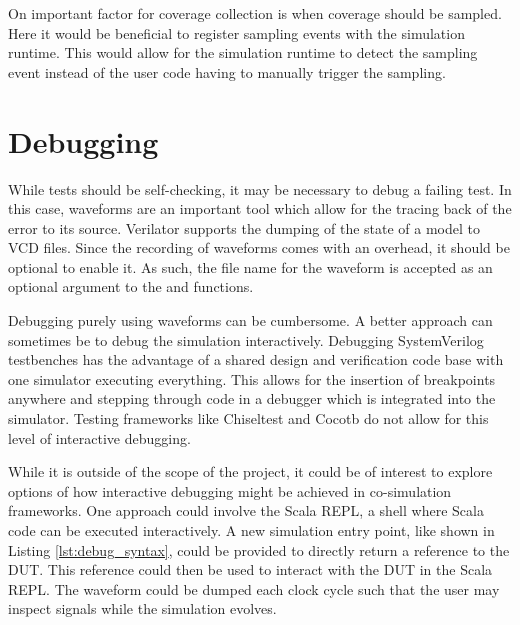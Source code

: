 On important factor for coverage collection is when coverage should be sampled. Here it would be beneficial to
register sampling events with the simulation runtime. This would allow for the simulation runtime to detect the
sampling event instead of the user code having to manually trigger the sampling.

\section{Debugging} %

While tests should be self-checking, it may be necessary to debug a failing test. In this case, waveforms are an
important tool which allow for the tracing back of the error to its source. Verilator supports the dumping of the
state of a model to VCD files. Since the recording of waveforms comes with an overhead, it should be optional to
enable it. As such, the file name for the waveform is accepted as an optional argument to the  and
 functions.

Debugging purely using waveforms can be cumbersome. A better approach can sometimes be to debug the simulation
interactively. Debugging SystemVerilog testbenches has the advantage of a shared design and verification code base with one simulator executing everything. This allows for the insertion of breakpoints anywhere and stepping through code
in a debugger which is integrated into the simulator. Testing frameworks like Chiseltest and Cocotb do not allow for
this level of interactive debugging. 

While it is outside of the scope of the project, it could be of interest to
explore options of how interactive debugging might be achieved in co-simulation frameworks. One approach could
involve the Scala REPL, a shell where Scala code can be executed interactively. A new simulation entry point, like
shown in Listing \ref{lst:debug_syntax}, could be provided to directly return a reference to the DUT. This reference
could then be used to interact with the DUT in the Scala REPL. The waveform could be dumped each clock cycle such
that the user may inspect signals while the simulation evolves.

